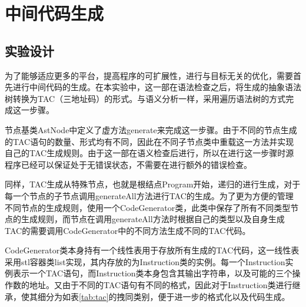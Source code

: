 \chapter{中间代码生成}
\label{cha:zhong_jian_dai_ma_sheng_cheng_}

\section{实验设计}
\label{sec:shi_yan_she_ji_3}
\par 为了能够适应更多的平台，提高程序的可扩展性，进行与目标无关的优化，需要首先进行中间代码的生成。在本实验中，这一部在语法检查之后，将生成的抽象语法树转换为TAC（三地址码）的形式。与语义分析一样，采用遍历语法树的方式完成这一步骤。
\par 节点基类AstNode中定义了虚方法generate来完成这一步骤。由于不同的节点生成的TAC语句的数量、形式均有不同，因此在不同子节点类中重载这一方法并实现自己的TAC生成规则。由于这一部在语义检查后进行，所以在进行这一步骤时源程序已经可以保证处于无错误状态，不需要在进行额外的错误检查。
\par 同样，TAC生成从特殊节点，也就是根结点Program开始，递归的进行生成，对于每一个节点的子节点调用generateAll方法进行TAC的生成。为了更为方便的管理不同节点的生成规则，使用一个CodeGenerator类，此类中保存了所有不同类型节点的生成规则，而节点在调用generateAll方法时根据自己的类型以及自身生成TAC的需要调用CodeGenerator中的不同方法生成不同的TAC代码。
\par CodeGenerator类本身持有一个线性表用于存放所有生成的TAC代码，这一线性表采用stl容器类list实现，其内存放的为Instruction类的实例。每一个Instruction实例表示一个TAC语句，而Instruction类本身包含其输出字符串，以及可能的三个操作数的地址。又由于不同的TAC语句有不同的格式，因此对于Instruction类进行继承，使其细分为如表\ref{tab:tac}的拽同类别，便于进一步的格式化以及代码生成。
